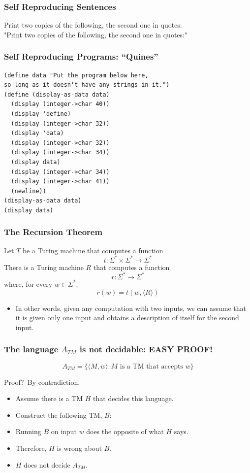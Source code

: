 \documentclass{beamer}
\newcommand{\bfr}[1]{\begin{frame}[fragile]\frametitle{{ #1 }}}
\begin{document}
\bfr{Self Reproducing Sentences}

{\large
  Print two copies of the following, the second one in quotes:\\
  "Print two copies of the following, the second one in quotes:"
}
\end{frame}

\bfr{Self Reproducing Programs:  ``Quines''}
\begin{Verbatim}
(define data "Put the program below here,
so long as it doesn't have any strings in it.")
(define (display-as-data data)
  (display (integer->char 40))
  (display 'define)
  (display (integer->char 32))
  (display 'data)
  (display (integer->char 32))
  (display (integer->char 34))
  (display data)
  (display (integer->char 34))
  (display (integer->char 41))
  (newline))
(display-as-data data)
(display data)
\end{Verbatim}
\end{frame}

\bfr{The Recursion Theorem}

Let $T$ be a Turing machine that computes a function
\[
t : \Sigma^*\times \Sigma^* \rightarrow \Sigma^*
\]
There is a Turing machine $R$ that computes a function
\[
r : \Sigma^* \rightarrow \Sigma^*
\]
where, for every $w\in\Sigma^*$,
\[
r(w) = t(w, \langle R \rangle)
\]
\vfill
\pause
\begin{itemize}
\item In other words, given any computation with
  two inputs, we can assume that it is given only one input
  and obtains a description of itself for the second input.
\end{itemize}

\end{frame}

\bfr{The language $A_{TM}$ is not decidable:  EASY PROOF!}
\[
A_{TM} = \{ \langle M,w\rangle : \mbox{$M$ is a TM that accepts $w$}\}
\]

Proof?\pause\ By contradiction. 

\begin{itemize}
  \item Assume there is a TM $H$ that decides this
    language.
  \item Construct the following TM, $B$:

\centerline{
}
\item Running $B$ on input $w$ does the opposite of what $H$ says.
\item Therefore, $H$ is wrong about $B$.
\item $H$ does not decide $A_{TM}$.
\end{itemize}

\end{frame}
\end{document}

